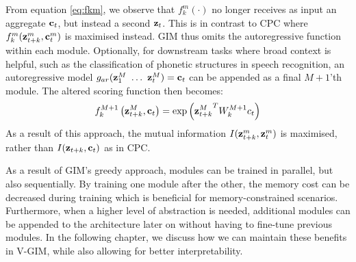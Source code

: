 		From equation \ref{eq:fkm}, we observe that $f_k^m( \cdot )$ no longer receives as input an aggregate $\mathbf{c}_t$, but instead a second $\mathbf{z}_t$. This is in contrast to CPC where $f_k^m(\mathbf{z}_{t+k}^m,\mathbf{c}_t^m)$ is maximised instead. GIM thus omits the autoregressive function within each module. Optionally, for downstream tasks where broad context is helpful, such as the classification of phonetic structures in speech recognition, an autoregressive model $g_{ar}(\mathbf{z}_1^M ~ \dots ~ \mathbf{z}_t^M) = \mathbf{c}_t$ can be appended as a final $M+1$'th module. The altered scoring function then becomes:
		$$
		f_k^{M+1}\left(\mathbf{z}_{t+k}^M, \mathbf{c}_t \right)=\exp \left({\mathbf{z}_{t+k}^M}^T W_k^{M+1} c_t \right)
		$$
		As a result of this approach, the mutual information $I(\mathbf{z}_{t+k}^m,\mathbf{z}_t^m)$ is maximised, rather than $I(\mathbf{z}_{t+k}, \mathbf{c}_t)$ as in CPC. 
		
		As a result of GIM's greedy approach, modules can be trained in parallel, but also sequentially. By training one module after the other, the memory cost can be decreased during training which is beneficial for memory-constrained scenarios. Furthermore, when a higher level of abstraction is needed, additional modules can be appended to the architecture later on without having to fine-tune previous modules. In the following chapter, we discuss how we can maintain these benefits in V-GIM, while also allowing for better interpretability.

	

